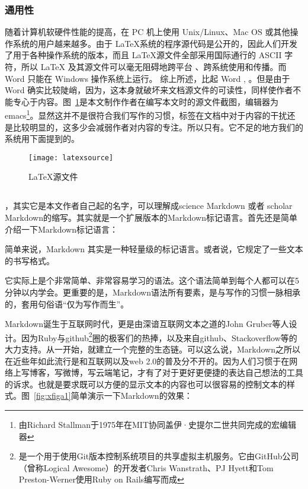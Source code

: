 \subsubsection{通用性}
\label{sec:tongyongxing}

随着计算机软硬件性能的提高，在 PC 机上使用 Unix/Linux、Mac OS 或其他操作系统的用户越来越多。由于 \LaTeX 系统的程序源代码是公开的，因此人们开发了用于各种操作系统的版本，而且 \LaTeX 源文件全部采用国际通行的 ASCII 字符，所以 LaTeX 及其源文件可以毫无阻碍地跨平台 、跨系统使用和传播。而 Word 只能在 Windows 操作系统上运行。
综上所述，比起 Word , 。但是由于 Word 确实比较陡峭，因为，这本身就破坏来文档源文件的可读性，同样使作者不能专心于内容。图~\ref{fig:xfig6}是本文制作作者在编写本文时的源文件截图，编辑器为emacs\footnote{由Richard Stallman于1975年在MIT协同盖伊·史提尔二世共同完成的宏编辑器}。显然这并不是很符合我们写作的习惯，标签在文档中对于内容的干扰还是比较明显的，这多少会减弱作者对内容的专注。所以只有。它不足的地方我们的系统用下面提到的。
\begin{figure}[H]
  \centering
  \texttt{[image: latexsource]}
  \caption{LaTeX源文件}
  \label{fig:xfig6}
\end{figure}

\subsection{}
\label{sec:smarkdown}

，其实它是本文作者自己起的名字，可以理解成science Markdown 或者 scholar Markdown的缩写。其实就是一个扩展版本的Markdown标记语言。首先还是简单介绍一下Markdown\cite{abari2012reproducible,rantakari2011adapting}标记语言：

简单来说，Markdown 其实是一种轻量级的标记语言。或者说，它规定了一些文本的书写格式。

它实际上是个非常简单、非常容易学习的语法。这个语法简单到每个人都可以在5分钟以内学会。更重要的是，Markdown语法所有要素，是与写作的习惯一脉相承的，套用句俗语“仅为写作而生”。

Markdown诞生于互联网时代，更是由深谙互联网文本之道的John Gruber等人设计。因为Ruby与github\footnote{是一个用于使用Git版本控制系统项目的共享虚拟主机服务。它由GitHub公司（曾称Logical Awesome）的开发者Chris Wanstrath、PJ Hyett和Tom Preston-Werner使用Ruby on Rails编写而成}圈的极客们的热捧，以及来自github、Stackoverflow等的大力支持。从一开始，就建立一个完整的生态链。可以这么说，Markdown之所以在近些年如此流行是和互联网以及web 2.0的普及分不开的。因为人们习惯于在网络上写博客，写微博，写云端笔记，才有了对于更好更便捷的表达自己想法的工具的诉求。也就是要求既可以方便的显示文本的内容也可以很容易的控制文本的样式。图~\ref{fig:xfiga1}简单演示一下Markdown的效果：

